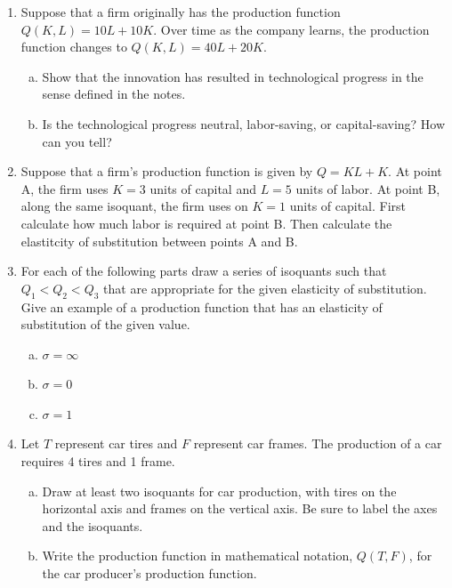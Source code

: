 \documentclass[11pt]{article}
\begin{document}
\begin{enumerate}
  \newpage
  \item Suppose that a firm originally has the production function $Q(K, L) = 10L + 10K$. Over time as the company learns, the production function changes to $Q(K, L) = 40L + 20K$.
  
  \begin{enumerate}[(a)]
    \item Show that the innovation has resulted in technological progress in the sense defined in the notes.
    
    \vspace*{40mm}
    \item Is the technological progress neutral, labor-saving, or capital-saving? How can you tell?
  \end{enumerate}
  
  \vspace*{40mm}
  \item Suppose that a firm's production function is given by $Q = KL +K$.  At point A, the firm uses $K= 3$ units of capital and $L = 5$ units of labor.  At point B, along the same isoquant, the firm uses on $K = 1$ units of capital.  First calculate how much labor is required at point B.  Then calculate the elastitcity of substitution between points A and B.

\newpage
  \item For each of the following parts draw a series of isoquants such that $Q_{1} < Q_{2} < Q_{3}$ that are appropriate for the given elasticity of substitution.  Give an example of a production function that has an elasticity of substitution of the given value.
  
  \begin{enumerate}[(a)]
    \item $\sigma = \infty$
    
    
    \vspace*{60mm}
    \item $\sigma = 0$
    
    
    \vspace*{60mm}
    \item $\sigma = 1$
  \end{enumerate}


  \newpage
  \item Let $T$ represent car tires and $F$ represent car frames. The production of a car requires 4 tires and 1 frame. 
  \begin{enumerate}[(a)]
    \item Draw at least two isoquants for car production, with tires on the horizontal axis and frames on the vertical axis. Be sure to label the axes and the isoquants.
    
    \vspace*{100mm}
    \item Write the production function in mathematical notation, $Q(T, F)$, for the car producer's production function.
  \end{enumerate}
\end{enumerate}
\end{document}
